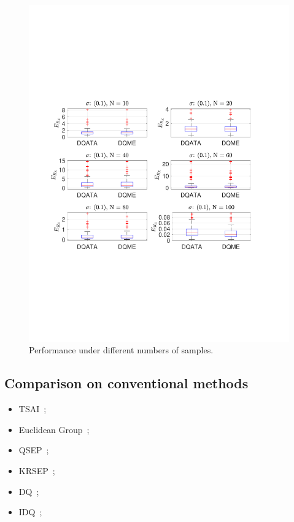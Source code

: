 \begin{figure}
\includegraphics[scale=0.6]{./hand_eye_figures/dq/dq_et_cmp_num}
\caption{Performance under different numbers of samples.}
\end{figure}


\subsection{Comparison on conventional methods}
\begin{itemize}
	\item TSAI~\cite{tsai1989new};
	\item Euclidean Group~\cite{park1994robot};
	\item QSEP~\cite{horaud1995hand};
	\item KRSEP~\cite{andreff1999line};
	\item DQ~\cite{daniilidis1999hand};
	\item IDQ~\cite{malti2010robust};
\end{itemize}

